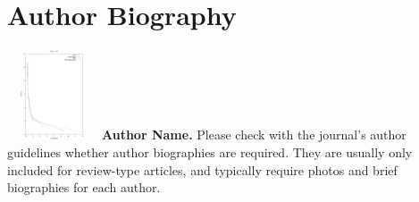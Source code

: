\documentclass[12p,AMS,STIX1COL]{WileyNJD-v5}
\begin{document}



\section{Author Biography}

\begin{biography}{\includegraphics[width=76pt,height=76pt,draft]{figures/128nodes-byzantine.png}}
      {\textbf{Author Name.} Please check with the journal’s author guidelines
      whether author biographies are required. They are usually only
      included for review-type articles, and typically require photos
      and brief biographies for each author.}
\end{biography}
\end{document}
